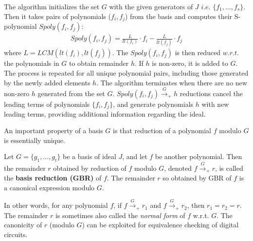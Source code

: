 The algorithm initializes the set $G$ with the given generators of $J$
$i.e.$ $\{f_1,\dots,f_s\}$. Then it takes pairs of polynomials
($f_i,f_j$) from the basis and computes their S-polynomial
$Spoly(f_i,f_j)$:
\begin{equation}
\label{spoly}
\begin{split}
Spoly(f_i,f_j) = \frac{L}{lt(f_i)}\cdot f_i - \frac{L}{lt(f_j)}\cdot f_j
\end{split}
\end{equation}
where $L = LCM(lt(f_i),lt(f_j))$. The $Spoly(f_i,f_j)$ is then reduced
$w.r.t.$ the polynomials in $G$ to obtain remainder $h$. If $h$ is
non-zero, it is added to $G$. The process is repeated for all unique
polynomial pairs, including those generated by the newly added
elements $h$. The algorithm terminates when there are no new non-zero
$h$ generated from the set $G$. $Spoly(f_i,f_j)\xrightarrow{G}_+h$
reductions cancel the leading terms of polynomials $\{f_i,f_j\}$, and
generate polynomials $h$ with new leading terms, providing additional
information regarding the ideal.  

An important property of a \Grobner basis $G$ is that reduction of a
polynomial $f$ modulo $G$ is essentially unique. 


\begin{Theorem} 
\label{thm:gbr}
Let $G=\{g_1,\dots,g_t\}$ be a \Grobner basis of ideal $J$, and let $f$
  be another polynomial.  Then the remainder $r$ obtained by reduction
  of $f$ modulo $G$, denoted $f\xrightarrow{G}_+r$, is called the
  {\bf \Grobner basis reduction (GBR)} of $f$. The remainder $r$
  so obtained by GBR of $f$ is a {canonical expression
    modulo $G$}.  
\end{Theorem}

In other words, for {any polynomial} $f$, if $f\xrightarrow{G}_+r_1$
and $f\xrightarrow{G}_+r_2$, then $r_1 = r_2=r$. 
The remainder $r$ is sometimes also called the {\it normal form} of
$f$ w.r.t. $G$. The canonicity of $r$ (modulo $G$) can be exploited
for equivalence checking of digital circuits. 



